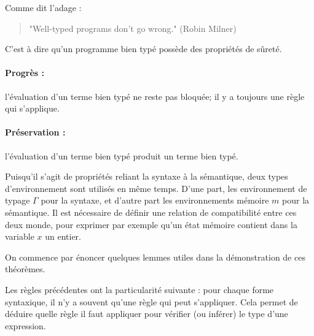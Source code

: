 Comme dit l'adage :

\begin{quote}
"Well-typed programs don't go wrong." (Robin Milner)
\end{quote}

C'est à dire qu'un programme bien typé possède des propriétés de sûreté.

\paragraph{Progrès :} l'évaluation d'un terme bien typé ne reste pas bloquée;
il y a toujours une règle qui s'applique.

\paragraph{Préservation :} l'évaluation d'un terme bien typé produit un terme
bien typé.

Puisqu'il s'agit de propriétés reliant la syntaxe à la sémantique, deux types
d'environnement sont utilisés en même temps. D'une part, les environnement de
typage $Γ$ pour la syntaxe, et d'autre part les environnements mémoire $m$ pour
la sémantique. Il est nécessaire de définir une relation de compatibilité entre
ces deux monde, pour exprimer par exemple qu'un état mémoire contient dans la
variable $x$ un entier.

On commence par énoncer quelques lemmes utiles dans la démonstration de ces
théorèmes.

Les règles précédentes ont la particularité suivante : pour chaque forme
syntaxique, il n'y a souvent qu'une règle qui peut s'appliquer. Cela permet de
déduire quelle règle il faut appliquer pour vérifier (ou inférer) le type d'une
expression.

